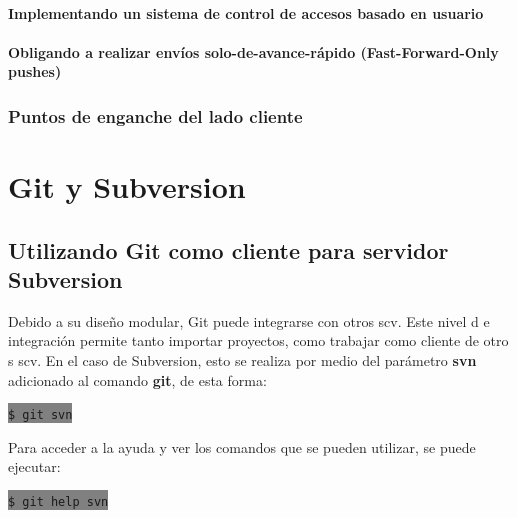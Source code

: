 \documentclass[12pt, spanish, oneside, onecolumn, a4paper]{report}
\newcommand{\shellcmd}[1]{ %

  \colorbox{Gray}{
    \indent\indent\texttt{\footnotesize\$ #1}
  }

}
\begin{document}
\subsubsection{Implementando un sistema de control de accesos basado en usuario} 
\label{sec:userbasedaccesscontrol} 
\subsubsection{Obligando a realizar envíos solo-de-avance-rápido (Fast-Forward-Only pushes)} 
\label{sec:onlyfastforward} 
\subsection{Puntos de enganche del lado cliente} 
\label{sec:clienthook}


\chapter{Git y Subversion} 
\label{chap:gitsvn} 
\section{Utilizando Git como cliente para servidor Subversion} 
\label{sec:gitclientsvn} Debido a su diseño modular, Git puede integrarse con otros 
\gls{scv}. Este nivel d e integración permite tanto importar proyectos, como trabajar como cliente de otro s 
\gls{scv}. En el caso de Subversion, esto se realiza por medio del parámetro 
\textbf{svn} adicionado al comando 
\textbf{git}, de esta forma: 
\shellcmd{git svn} Para acceder a la ayuda y ver los comandos que se pueden utilizar, se puede ejecutar: 
\shellcmd{git help svn} 
\end{document}
